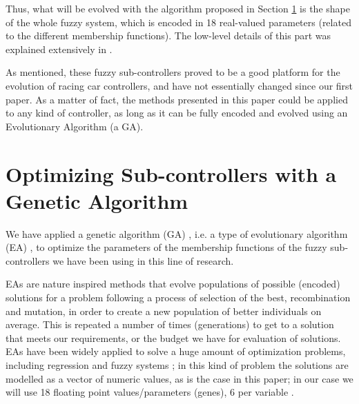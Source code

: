 \documentclass[10pt,journal,compsoc]{IEEEtran}
\begin{document}
Thus, what will be evolved with the algorithm proposed in Section \ref{sec:ga} is the shape of the whole fuzzy system, which is encoded in 18 real-valued parameters (related to the different membership functions). The low-level details of this part was explained extensively in \cite{DBLP:conf/cig/SalemMG19}. 

As mentioned, these fuzzy sub-controllers proved to be a good platform for the evolution of racing car controllers, and have not essentially changed since our first paper. As a matter of fact, the methods presented in this paper could
be applied to any kind of controller, as long as it can be fully
encoded and evolved using an Evolutionary Algorithm (a GA).




\section{Optimizing Sub-controllers with a Genetic Algorithm}
\label{sec:ga}




We have applied a genetic algorithm (GA) \cite{GAs_Goldberg89}, i.e. a type of evolutionary algorithm (EA) \cite{EAs_Back96}, to optimize the parameters of the membership functions of the fuzzy sub-controllers we have been using in this line of research. 

EAs are nature inspired methods that evolve populations of possible (encoded) solutions for a problem following a process of selection of the best,
recombination and mutation, in order to create a new population of
better individuals on average. This is repeated a number of times
(generations) to get to a solution that meets our requirements, or the
budget we have for evaluation of solutions. EAs have been widely
applied to solve a huge amount of optimization problems, including regression and fuzzy systems \cite{hoffmann2001evolutionary}; in this kind of problem the solutions are modelled as a vector of numeric values, as is the
case in this paper; in our case we will use 18 floating point values/parameters (genes), 6 per variable \cite{10.1007/978-3-319-77538-8_24}.
\end{document}
